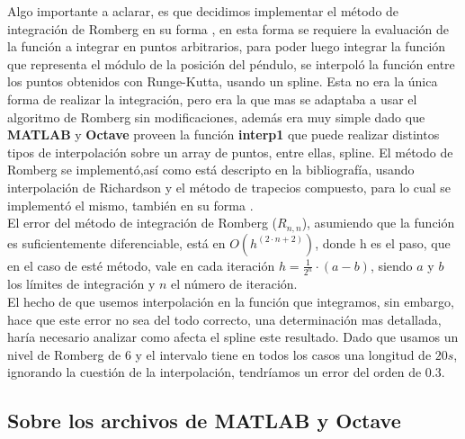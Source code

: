 Algo importante a aclarar, es que decidimos implementar el método de integración de Romberg en su forma , en esta forma se requiere la evaluación de la función a integrar en puntos arbitrarios, para poder luego integrar la función que representa el módulo de la posición del péndulo, se interpoló la función entre los puntos obtenidos con Runge-Kutta, usando un spline. Esta no era la única forma de realizar la integración, pero era la que mas se adaptaba a usar el algoritmo de Romberg sin modificaciones, además era muy simple dado que \textbf{MATLAB} y \textbf{Octave} proveen la función \textbf{interp1} que puede realizar distintos tipos de interpolación sobre un array de puntos, entre ellas, spline.
El método de Romberg se implementó,así como está descripto en la bibliografía, usando interpolación de Richardson y el método de trapecios compuesto, para lo cual se implementó el mismo, también en su forma .\\

El error del método de integración de Romberg ($R_{n,n}$), asumiendo que la función es suficientemente diferenciable, está en $O \left(  h^{\left( 2 \cdot n + 2 \right)}  \right)$, donde h es el paso, que en el caso de esté método, vale en cada iteración $h = \frac{1}{2^{n}} \cdot \left( a - b \right)$, siendo $a$ y $b$ los límites de integración y $n$ el número de iteración.\\

El hecho de que usemos interpolación en la función que integramos, sin embargo, hace que este error no sea del todo correcto, una determinación mas detallada, haría necesario analizar como afecta el spline este resultado. Dado que usamos un nivel de Romberg de $6$ y el intervalo tiene en todos los casos una longitud de $20s$, ignorando la cuestión de la interpolación, tendríamos un error del orden de $0.3$.






\clearpage

\subsection{Sobre los archivos de \textbf{MATLAB} y \textbf{Octave}}

